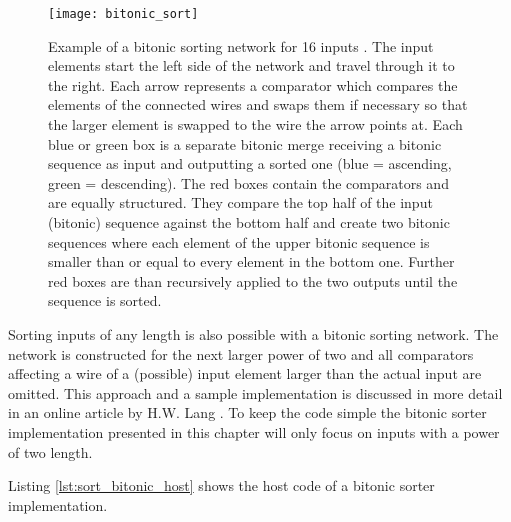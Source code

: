 \begin{figure}
\centering
\texttt{[image: bitonic\_sort]}
\caption{Example of a bitonic sorting network for 16 inputs \cite{wiki_bitonic_sort}. The input elements start the left side of the network and travel through it to the right. Each arrow represents a comparator which compares the elements of the connected wires and swaps them if necessary so that the larger element is swapped to the wire the arrow points at. Each blue or green box is a separate bitonic merge receiving a bitonic sequence as input and outputting a sorted one (blue = ascending, green = descending). The red boxes contain the comparators and are equally structured. They compare the top half of the input (bitonic) sequence against the bottom half and create two bitonic sequences where each element of the upper bitonic sequence is smaller than or equal to every element in the bottom one. Further red boxes are than recursively applied to the two outputs until the sequence is sorted.}
\label{fig:bitonic_sort}
\end{figure}

Sorting inputs of any length is also possible with a bitonic sorting network. The network is constructed for the next larger power of two and all comparators affecting a wire of a (possible) input element larger than the actual input are omitted. This approach and a sample implementation is discussed in more detail in an online article by H.W. Lang \cite{sort_bitonic_arbitrary_n}. To keep the code simple the bitonic sorter implementation presented in this chapter will only focus on inputs with a power of two length.

Listing \ref{lst:sort_bitonic_host} shows the host code of a bitonic sorter implementation.



